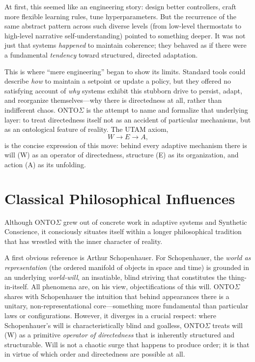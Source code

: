 \documentclass[12pt,a4paper]{report}
\newcommand{\Will}{W}
\newcommand{\Struct}{E}
\newcommand{\Act}{A}
\begin{document}
At first, this seemed like an engineering story: design better controllers, craft more flexible learning rules, tune hyperparameters. But the recurrence of the same abstract pattern across such diverse levels (from low-level thermostats to high-level narrative self-understanding) pointed to something deeper. It was not just that systems \emph{happened} to maintain coherence; they behaved as if there were a fundamental \emph{tendency} toward structured, directed adaptation.

This is where ``mere engineering'' began to show its limits. Standard tools could describe \emph{how} to maintain a setpoint or update a policy, but they offered no satisfying account of \emph{why} systems exhibit this stubborn drive to persist, adapt, and reorganize themselves---why there is directedness at all, rather than indifferent chaos. ONTO$\Sigma$ is the attempt to name and formalize that underlying layer: to treat directedness itself not as an accident of particular mechanisms, but as an ontological feature of reality. The UTAM axiom,
\[
    W \to E \to A,
\]
is the concise expression of this move: behind every adaptive mechanism there is will (\Will) as an operator of directedness, structure (\Struct) as its organization, and action (\Act) as its unfolding.

\section{Classical Philosophical Influences}

Although ONTO$\Sigma$ grew out of concrete work in adaptive systems and Synthetic Conscience, it consciously situates itself within a longer philosophical tradition that has wrestled with the inner character of reality.

A first obvious reference is Arthur Schopenhauer. For Schopenhauer, the \emph{world as representation} (the ordered manifold of objects in space and time) is grounded in an underlying \emph{world-will}, an insatiable, blind striving that constitutes the thing-in-itself. All phenomena are, on his view, objectifications of this will. ONTO$\Sigma$ shares with Schopenhauer the intuition that behind appearances there is a unitary, non-representational core---something more fundamental than particular laws or configurations. However, it diverges in a crucial respect: where Schopenhauer's will is characteristically blind and goalless, ONTO$\Sigma$ treats will (\Will) as a primitive \emph{operator of directedness} that is inherently structured and structurable. Will is not a chaotic surge that happens to produce order; it is that in virtue of which order and directedness are possible at all.
\end{document}
